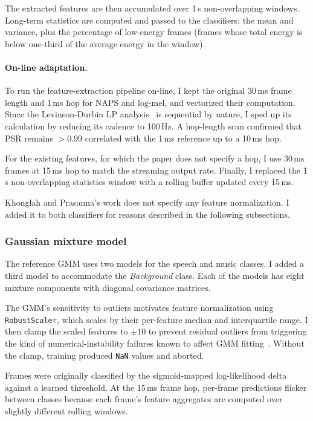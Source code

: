 The extracted features are then accumulated over 1\,s non-overlapping windows.
Long-term statistics are computed and passed to the classifiers: the mean and variance, plus the percentage of low-energy frames (frames whose total energy is below one-third of the average energy in the window).

\paragraph{On-line adaptation.}
To run the feature-extraction pipeline on-line, I kept the original 30\,ms frame length and 1\,ms hop for NAPS and log-mel, and vectorized their computation.
Since the Levinson-Durbin LP analysis~\cite{makhoul1975lp} is sequential by nature, I sped up its calculation by reducing its cadence to 100\,Hz.
A hop-length scan confirmed that PSR remains $>0.99$ correlated with the 1\,ms reference up to a 10\,ms hop.

For the existing features, for which the paper does not specify a hop, I use 30\,ms frames at 15\,ms hop to match the streaming output rate.
Finally, I replaced the 1\,s non-overlapping statistics window with a rolling buffer updated every 15\,ms.

Khonglah and Prasanna's work does not specify any feature normalization.
I added it to both classifiers for reasons described in the following subsections.

\subsubsection{Gaussian mixture model}

The reference GMM uses two models for the speech and music classes.
I added a third model to accommodate the \emph{Background} class.
Each of the models has eight mixture components with diagonal covariance matrices.

The GMM's sensitivity to outliers motivates feature normalization using \texttt{RobustScaler}, which scales by their per-feature median and interquartile range.
I then clamp the scaled features to $\pm10$ to prevent residual outliers from triggering the kind of numerical-instability failures known to affect GMM fitting~\cite[§9.2.2]{bishop2006prml}.
Without the clamp, training produced \texttt{NaN} values and aborted.

Frames were originally classified by the sigmoid-mapped log-likelihood delta against a learned threshold.
At the 15\,ms frame hop, per-frame predictions flicker between classes because each frame's feature aggregates are computed over slightly different rolling windows.

